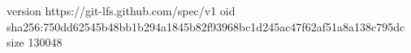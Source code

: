 version https://git-lfs.github.com/spec/v1
oid sha256:750dd62545b48bb1b294a1845b82f93968bc1d245ac47f62af51a8a138c795dc
size 130048

